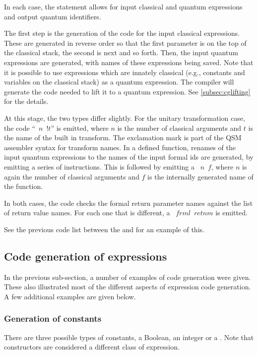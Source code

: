 In each case, the statement allows for input classical and quantum expressions
and output quantum identifiers.

The first step is the generation of the code for the input 
classical expressions. These are generated in reverse order so that the 
first parameter is on the top of the classical stack, the second is next
and so forth. Then, the input quantum expressions are generated,
with names of these expressions being saved. Note that it is possible to use
expressions which are innately classical (e.g., constants and variables on
the classical stack) as a quantum expression. The compiler will generate 
the code needed to lift it to a quantum expression. See 
\vref{subsec:cglifting} for the details.

At this stage, the two
types differ slightly. For the unitary transformation case, the
code ``~$n$~!$t$'' is emitted, where $n$ is the number of 
classical arguments and $t$ is the name of the built in transform. The
exclamation mark is part of the QSM assembler syntax for transform names.
In a defined function, renames of the input quantum expressions to
the names of the input formal ids are generated, 
by emitting a series of  
instructions. This is followed by emitting a ~$n$~$f$, 
where $n$ is again the number of classical arguments and $f$ is the 
internally generated name of the function.

In both cases, the code checks the formal return parameter names against
the list of return value names. For each one that is different, a 
~$frml$~$retnm$ is emitted.

See the previous code list between the   and
 for an example of this.



\subsection{Code generation of expressions}\label{subsec:cgexpression}
In the previous sub-section, a number of examples of code generation
were given. These also illustrated most of the different aspects of 
expression code generation. A few additional examples are given below.

\subsubsection{Generation of constants}
There are three possible types of constants, a Boolean, an integer or 
a \qbit. Note that constructors are considered a different class of 
expression.

